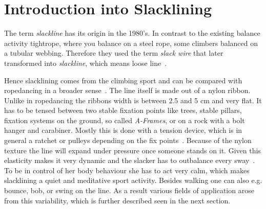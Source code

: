 \section{Introduction into Slacklining}\label{3_1_introductionSlacklining}
The term \textit{slackline} has its origin in the 1980's. In contrast to the existing balance activity tightrope, where you balance on a steel rope, some climbers balanced on a tubular webbing. Therefore they used the term \textit{slack wire} that later transformed into \textit{slackline}, which means loose line~\cite{Zak2011-sl, Balcom2005-wl, MillerMauser2013-sl}.

Hence slacklining comes from the climbing sport and can be compared with ropedancing in a broader sense~\cite{Kleindl2011-bl}. The line itself is made out of a nylon ribbon. Unlike in ropedancing the ribbons width is between 2.5 and 5 cm and very flat. It has to be tensed between two stable fixation points like trees, stable pillars, fixation systems on the ground, so called \textit{A-Frames}, or on a rock with a bolt hanger and carabiner. Mostly this is done with a tension device, which is in general a ratchet or pulleys depending on the fix points~\cite{Kleindl2011-bl}. Because of the nylon texture the line will expand under pressure once someone stands on it. Given this elasticity makes it very dynamic and the slacker has to outbalance every sway~\cite{Kroiss2007-ab}. To be in control of her body behaviour she has to act very calm, which makes slacklining a quiet and meditative sport activity. Besides walking one can also e.g. bounce, bob, or swing on the line. As a result various fields of application arose from this variability, which is further described seen in the next section.